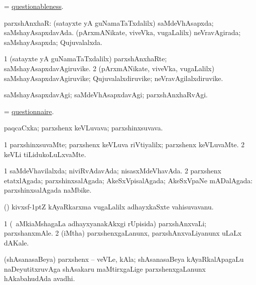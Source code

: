 \bentry
{}
\gl{\nA}
\bmng
= \hyperlink{questionableness}{questionableness}. 
\emng
\eentry

\bentry
{}
\gl{\gu}
\bmng
parxshAnxhaR: 
\banum
{} (satayxte yA guNamaTaTxdalilx) saMdeVhA\-sapxda; saMshayAsapxdavAda. 
 (pArxmANikate, viveVka, \mo vugaLalilx) neVravAgirada; saMshayAsapxda; Qujuvalalxda. 
\eanum
\emng
\eentry

\bentry
{}
\gl{\nA}
\bmng
\bnum
\num{1} (satayxte yA guNamaTaTxdalilx) parxshAnxhaRte; saMshayAsapxdavAgiruvike. 
\num{2} (pArxmANikate, viveVka, \mo vugaLalilx) saMshayAsapxdavAgiruvike; Quju\-valalxdiruvike; neVravAgilalxdiruvike. 
\enum
\emng
\eentry

\bentry
{}
\gl{\kirxvi}
\bmng
saMshayAsapxdavAgi; saMdeVhAsapxdavAgi; parxshAnxhaRvAgi. 
\emng
\eentry

\bentry
{}
\gl{\nA}
\bmng
= \hyperlink{questionnaire}{questionnaire}. 
\emng
\eentry

\bentry
{}
\gl{\nA}
\bmng
paqcaCxka; parxshenx keVLuvava; parxshinxsuvava. 
\emng
\eentry

\bentry
{}
\gl{\kirxvi}
\bmng
\bnum
\num{1} parxshinxsuvaMte; parxshenx keVLuva riVtiyalilx; parxshenx keVLuvaMte. 
\num{2} keVLi tiLidukoLuLxvaMte. 
\enum
\emng
\eentry

\bentry
{}
\gl{\gu}
\bmng
\bnum
\num{1} saMdeVhavilalxda; niviRvAdavAda; nisasxMdeVhavAda. 
\num{2} parxshenx etatxlAgada; parxshinxsalAgada; AkeSxVpisalAgada; AkeSxVpaNe mADalAgada:   parxshinxsalAgada naMbike. 
\enum
\emng
\eentry

\bentry
{}
\gl{\nA}
\bmng
(\birx) kivxsf\kern -1ptZ kAyaRkarxma \mo vugaLalilx adhayxkaSxte vahisuvavanu. 
\emng
\eentry

\bentry
{}
\gl{\nA}
\bmng
\bnum
\num{1} (\kanmu\ aMkiaMshagaLa adhayxyanakAkxgi rUpisida) parxshAnxvaLi; parxshanxmAle. 
\num{2} (iMtha) parxshenxgaLanunx, parxshAnxvaLiyanunx uLaLx dAKale. 
\enum
\emng
\eentry

\bentry
{}
\gl{\nA}
\bmng
(shAsanasaBeya) parxshenx -- veVLe, kAla; shAsanasaBeya kAyaRkalApagaLu naDeyutitxruvAga shAsakaru maMtirxgaLige parxshenxgaLanunx hAkabahudAda avadhi. 
\emng
\eentry

